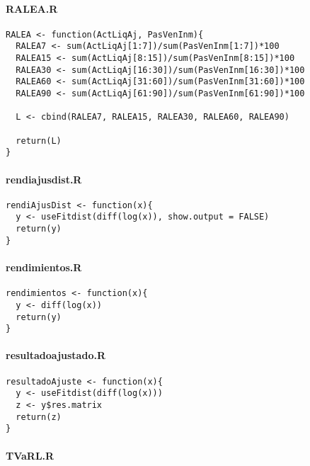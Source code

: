 \documentclass[]{article}
\begin{document}
\hypertarget{ralea.r}{%
\paragraph{RALEA.R}\label{ralea.r}}

\begin{verbatim}
RALEA <- function(ActLiqAj, PasVenInm){
  RALEA7 <- sum(ActLiqAj[1:7])/sum(PasVenInm[1:7])*100
  RALEA15 <- sum(ActLiqAj[8:15])/sum(PasVenInm[8:15])*100
  RALEA30 <- sum(ActLiqAj[16:30])/sum(PasVenInm[16:30])*100
  RALEA60 <- sum(ActLiqAj[31:60])/sum(PasVenInm[31:60])*100
  RALEA90 <- sum(ActLiqAj[61:90])/sum(PasVenInm[61:90])*100
  
  L <- cbind(RALEA7, RALEA15, RALEA30, RALEA60, RALEA90)
  
  return(L)
}
\end{verbatim}

\hypertarget{rendiajusdist.r}{%
\paragraph{rendiajusdist.R}\label{rendiajusdist.r}}

\begin{verbatim}
rendiAjusDist <- function(x){
  y <- useFitdist(diff(log(x)), show.output = FALSE)
  return(y)
}
\end{verbatim}

\hypertarget{rendimientos.r}{%
\paragraph{rendimientos.R}\label{rendimientos.r}}

\begin{verbatim}
rendimientos <- function(x){
  y <- diff(log(x))
  return(y)
}
\end{verbatim}

\hypertarget{resultadoajustado.r}{%
\paragraph{resultadoajustado.R}\label{resultadoajustado.r}}

\begin{verbatim}
resultadoAjuste <- function(x){
  y <- useFitdist(diff(log(x)))
  z <- y$res.matrix
  return(z)
}
\end{verbatim}

\hypertarget{tvarl.r}{%
\paragraph{TVaRL.R}\label{tvarl.r}}
\end{document}
